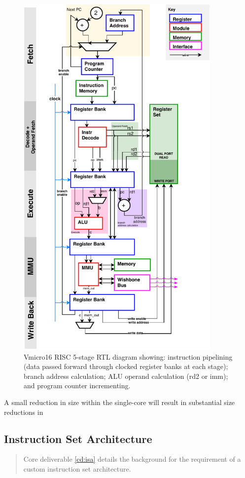 \begin{figure}[H]
\centering 
\includegraphics[width=10cm]{../img/risc}
\caption{Vmicro16 RISC 5-stage RTL diagram showing: instruction pipelining (data passed forward through clocked register banks at each stage); branch address calculation; ALU operand calculation (rd2 or imm); and program counter incrementing.}
\label{fig:risc}
\end{figure}

A small reduction in size within the single-core will result in substantial size reductions in 

\subsection{Instruction Set Architecture}
\begin{quotation}
\noindent Core deliverable \ref{cd:isa} details the background for the requirement of a custom instruction set architecture.
\end{quotation}

